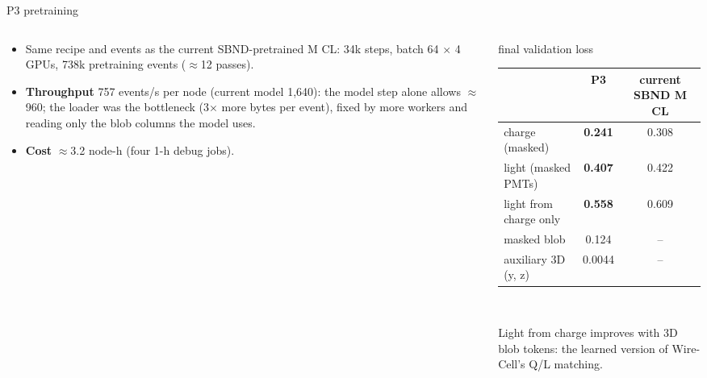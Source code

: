 \documentclass[aspectratio=169,10pt]{beamer}
\newcommand{\good}[1]{{\color{green!45!black}\textbf{#1}}}
\begin{document}
\begin{frame}{P3 pretraining}
  \footnotesize
  \begin{columns}[T]
    \begin{column}{0.50\textwidth}
      \begin{itemize}\setlength{\itemsep}{3pt}
        \item Same recipe and events as the current SBND-pretrained M CL: 34k steps, batch 64 $\times$ 4 GPUs, 738k pretraining events
          ($\approx$12 passes).
        \item \textbf{Throughput} 757 events/s per node (current model 1,640): the model step alone allows $\approx$960; the loader was the
          bottleneck (3$\times$ more bytes per event), fixed by more workers and reading only the blob columns the model uses.
        \item \textbf{Cost} $\approx$3.2 node-h (four 1-h debug jobs).
      \end{itemize}
    \end{column}
    \begin{column}{0.48\textwidth}
      \centering\scriptsize
      final validation loss\\[3pt]
      \begin{tabular}{lcc}
        \toprule
        & P3 & current SBND M CL \\
        \midrule
        charge (masked) & \good{0.241} & 0.308 \\
        light (masked PMTs) & \good{0.407} & 0.422 \\
        light from charge only & \good{0.558} & 0.609 \\
        masked blob & 0.124 & -- \\
        auxiliary 3D (y, z) & 0.0044 & -- \\
        \bottomrule
      \end{tabular}\\[6pt]
      \raggedright\footnotesize
      Light from charge improves with 3D blob tokens: the learned version of Wire-Cell's Q/L matching.
    \end{column}
  \end{columns}
\end{frame}

\end{document}
